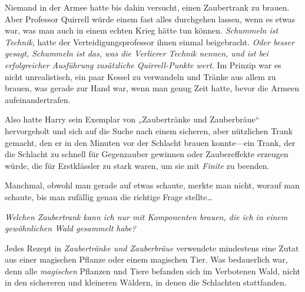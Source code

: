 Niemand in der Armee hatte bis dahin versucht, einen Zaubertrank zu brauen. Aber Professor Quirrell würde einem fast alles durchgehen lassen, wenn es etwas war, was man auch in einem echten Krieg hätte tun können. \emph{Schummeln ist Technik}, hatte der Verteidigungsprofessor ihnen einmal beigebracht. \emph{Oder besser gesagt, Schummeln ist das, was die Verlierer Technik nennen, und ist bei erfolgreicher Ausführung zusätzliche Quirrell-Punkte wert}. Im Prinzip war es nicht unrealistisch, ein paar Kessel zu verwandeln und Tränke aus allem zu brauen, was gerade zur Hand war, wenn man genug Zeit hatte, bevor die Armeen aufeinandertrafen.

Also hatte Harry sein Exemplar von „Zaubertränke und Zauberbräue“ hervorgeholt und sich auf die Suche nach einem sicheren, aber nützlichen Trank gemacht, den er in den Minuten vor der Schlacht brauen konnte—ein Trank, der die Schlacht zu schnell für Gegenzauber gewinnen oder Zaubereffekte erzeugen würde, die für Erstklässler zu stark waren, um sie mit \emph{Finite} zu beenden.

Manchmal, obwohl man gerade auf etwas schaute, merkte man nicht, worauf man schaute, bis man zufällig genau die richtige Frage stellte…

\emph{Welchen Zaubertrank kann ich nur mit Komponenten brauen, die ich in einem gewöhnlichen Wald gesammelt habe?}

Jedes Rezept in \emph{Zaubertränke und Zauberbräue} verwendete mindestens eine Zutat aus einer magischen Pflanze oder einem magischen Tier. Was bedauerlich war, denn alle \emph{magischen} Pflanzen und Tiere befanden sich im Verbotenen Wald, nicht in den sichereren und kleineren Wäldern, in denen die Schlachten stattfanden.

